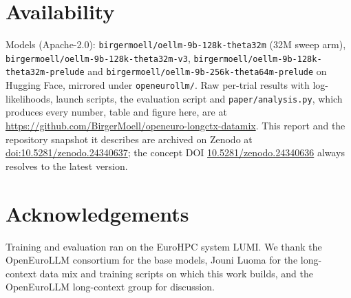 \documentclass[11pt]{article}
\begin{document}
\section*{Availability}
\label{sec:availability}
Models (Apache-2.0): \nolinkurl{birgermoell/oellm-9b-128k-theta32m} (32M sweep arm), \nolinkurl{birgermoell/oellm-9b-128k-theta32m-v3}, \nolinkurl{birgermoell/oellm-9b-128k-theta32m-prelude} and \nolinkurl{birgermoell/oellm-9b-256k-theta64m-prelude} on Hugging Face, mirrored under \nolinkurl{openeurollm/}. Raw per-trial results with log-likelihoods, launch scripts, the evaluation script and \nolinkurl{paper/analysis.py}, which produces every number, table and figure here, are at \url{https://github.com/BirgerMoell/openeuro-longctx-datamix}. This report and the repository snapshot it describes are archived on Zenodo at \href{https://doi.org/10.5281/zenodo.24340637}{doi:10.5281/zenodo.24340637}; the concept DOI \href{https://doi.org/10.5281/zenodo.24340636}{10.5281/zenodo.24340636} always resolves to the latest version.

\section*{Acknowledgements}
Training and evaluation ran on the EuroHPC system LUMI. We thank the OpenEuroLLM consortium for the base models, Jouni Luoma for the long-context data mix and training scripts on which this work builds, and the OpenEuroLLM long-context group for discussion.



\end{document}
